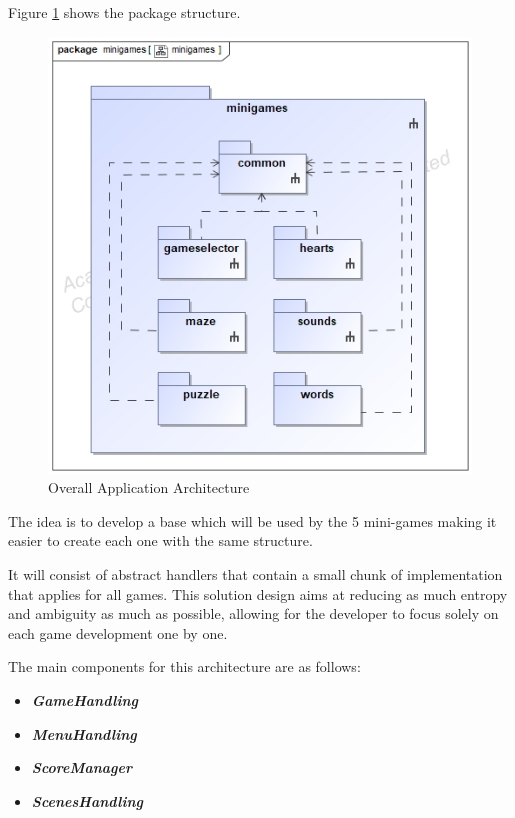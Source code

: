 \newpage
Figure \ref{fig:packages} shows the package structure.

\begin{figure}[H]
    \centering
    \includegraphics[scale=.5]{Chapters/arq/class__minigames__minigames.jpg}
    \caption{Overall Application Architecture}
    \label{fig:packages}
\end{figure}

The idea is to develop a base which will be used by the 5 mini-games making it easier to create each one with the same structure. 

It will consist of abstract handlers that contain a small chunk of implementation that applies for all games. This solution design aims at reducing as much entropy and ambiguity as much as possible, allowing for the developer to focus solely on each game development one by one.

The main components for this architecture are as follows:
\begin{itemize}
    \item \textbf{\textit{GameHandling}}
    \item  \textbf{\textit{MenuHandling}}
    \item \textbf{\textit{ScoreManager}}
    \item \textbf{\textit{ScenesHandling}}
\end{itemize}

